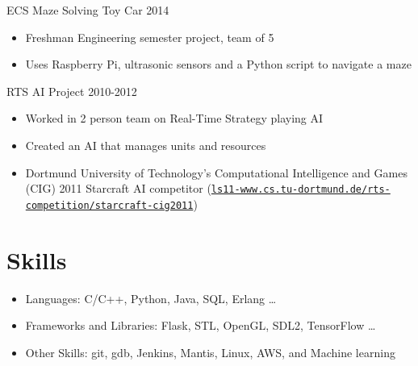 \documentclass[line,margin]{res}
\begin{document}
\begin{resume}


\vspace{-8pt}
ECS Maze Solving Toy Car
\hfill 2014
	\begin{itemize} \itemsep -2pt
	\item Freshman Engineering semester project, team of 5
	\item Uses Raspberry Pi, ultrasonic sensors and a Python script to navigate a maze
	\end{itemize}

\vspace{-8pt}
RTS AI Project
\hfill 2010-2012
\begin{itemize} \itemsep -2pt
	\item Worked in 2 person team on Real-Time Strategy playing AI
	\item Created an AI that manages units and resources
	\item Dortmund University of Technology’s Computational Intelligence and Games (CIG) 2011 Starcraft AI
	competitor (\href{http://ls11-www.cs.tu-dortmund.de/rts-competition/starcraft-cig2011}{\texttt{ls11-www.cs.tu-dortmund.de/rts-competition/starcraft-cig2011}})
\end{itemize}

\vspace{-4pt}
\section{Skills}
\vspace{22pt}
	\begin{itemize} \itemsep -2pt
		\item Languages: C/C++, Python, Java, SQL, Erlang \ldots
		\item Frameworks and Libraries: Flask, STL, OpenGL, SDL2, TensorFlow \ldots
		\item Other Skills: git, gdb, Jenkins, Mantis, Linux, AWS, and Machine learning
	\end{itemize}


\end{resume}
\end{document}
